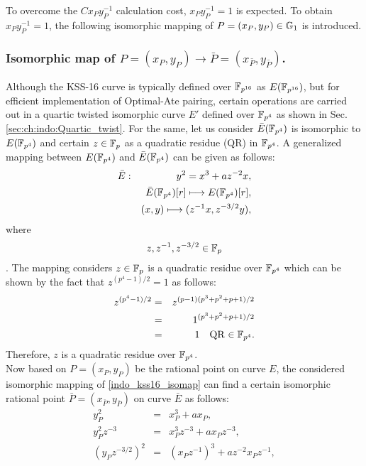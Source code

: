 To overcome the $Cx_{P}y_{P}^{-1}$  calculation cost, $x_{P}y_{P}^{-1} =1 $ is expected. 
To obtain $x_{P}y_{P}^{-1} = 1$, the following isomorphic mapping of $P=(x_P,y_P) \in {\mathbb{G}}_{1}$ is introduced. 


\subsubsection{Isomorphic map of \texorpdfstring{$P=(x_P,y_P) \to \bar P=(x_{\bar P},y_{\bar P})$}{}.}
Although the KSS-16 curve is typically defined over $\mathbb{F}_{p^{16}}$ as $E(\mathbb{F}_{p^{16}})$, but for efficient implementation of Optimal-Ate pairing, certain operations are carried out in a quartic twisted isomorphic curve $E'$ defined over $\mathbb{F}_{p^4}$ as shown in Sec. \ref{sec:ch:indo:Quartic_twist}. 
For the same, let us consider $\bar{E}(\mathbb{F}_{p^4})$ is isomorphic to $E(\mathbb{F}_{p^4})$ and certain $z \in {\mathbb{F}}_{p}$ as a quadratic residue (QR) in $\mathbb{F}_{p^4}$. 
A generalized mapping between $E(\mathbb{F}_{p^4})$ and $\bar{E}(\mathbb{F}_{p^4})$ can be given as follows:
\begin{eqnarray}
	\bar{E}&:&y^2=x^3+az^{-2}x,\nonumber\\
	&&\bar{E}(\mathbb{F}_{p^4})[r]\longmapsto E(\mathbb{F}_{p^4})[r],\nonumber\\
	&&(x,y)\longmapsto (z^{-1}x,z^{-3/2}y),\label{indo_kss16_isomap}\nonumber\\
\end{eqnarray}
	 where $$z, z^{-1},z^{-3/2}\in {\mathbb{F}}_{p}$$.
The mapping considers $z \in {\mathbb{F}}_{p}$ is a quadratic residue over $\mathbb{F}_{p^4}$ which can be shown by the fact that $z^{(p^4-1)/2} = 1$ as follows:
\begin{eqnarray}
 z^{(p^4-1)/2}& = &z^{(p-1)(p^3+p^2+p+1)/2 } \nonumber \\
& = &1^{(p^3+p^2+p+1)/2 } \nonumber \\
& = & 1 \quad \text{QR $\in \mathbb{F}_{p^4}$}.
\end{eqnarray}
Therefore, $z$ is a quadratic residue over $\mathbb{F}_{p^4}$.\\
Now  based on $P= (x_P, y_P)$ be the rational point on curve $E$, the considered isomorphic mapping of \eqref{indo_kss16_isomap}  can find a certain isomorphic rational point $\bar P = (x_{\bar P}, y_{\bar P})$ on curve $\bar E$ as follows:
\begin{eqnarray}\label{eq:indo_kss16_bar_P}
y_P^2 & = & x_P^3+ax_P, \nonumber \\
y_P^2 z^{-3}& = & x_P^3 z^{-3} +ax_Pz^{-3}, \nonumber \\
(y_P z^{-3/2})^2& = & (x_Pz^{-1})^3 +az^{-2} x_Pz^{-1},
\end{eqnarray}
